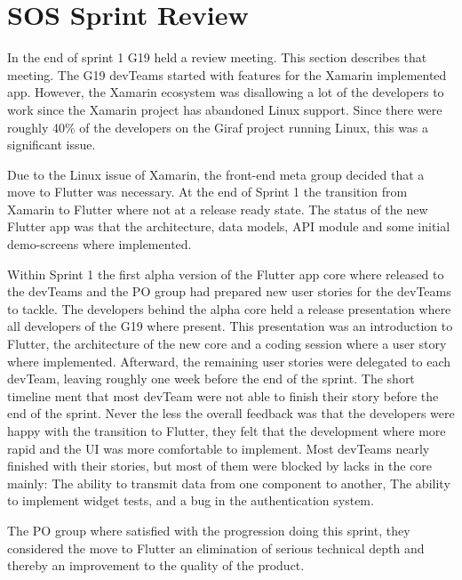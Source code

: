 \section{SOS Sprint Review}
In the end of sprint 1 \gls{G19} held a review meeting. This section describes that meeting.
The \gls{G19} \glspl{devTeam} started with features for the Xamarin implemented app. However, the Xamarin ecosystem was disallowing a lot of the developers to work since the Xamarin project has abandoned Linux support. Since there were roughly 40\% of the developers on the Giraf project running Linux, this was a significant issue.

Due to the Linux issue of Xamarin, the front-end meta group decided that a move to Flutter was necessary. At the end of Sprint 1 the transition from Xamarin to Flutter where not at a release ready state. The status of the new Flutter app was that the architecture, data models, API module and some initial demo-screens where implemented.

Within Sprint 1 the first alpha version of the Flutter app core where released to the \glspl{devTeam} and the \gls{PO} group had prepared new user stories for the \glspl{devTeam} to tackle. The developers behind the alpha core held a release presentation where all developers of the \gls{G19} where present. This presentation was an introduction to Flutter, the architecture of the new core and a coding session where a user story where implemented. Afterward, the remaining user stories were delegated to each \gls{devTeam}, leaving roughly one week before the end of the sprint. The short timeline ment that most \gls{devTeam} were not  able to finish their story before the end of the sprint. Never the less the overall feedback was that the developers were happy with the transition to Flutter, they felt that the development where more rapid and the UI was more comfortable to implement. Most \glspl{devTeam} nearly finished with their stories, but most of them were blocked by lacks in the core mainly: The ability to transmit data from one component to another, The ability to implement widget tests, and a bug in the authentication system.

The \gls{PO} group where satisfied with the progression doing this sprint, they considered the move to Flutter an elimination of serious technical depth and thereby an improvement to the quality of the product.
